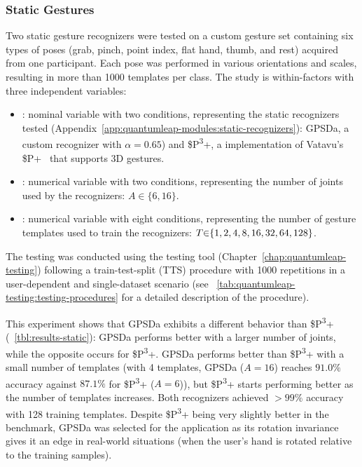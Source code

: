 \subsubsection{Static Gestures}
Two static gesture recognizers were tested on a custom gesture set containing six types of poses (grab, pinch, point index, flat hand, thumb, and rest) acquired from one participant. Each pose was performed in various orientations and scales, resulting in more than 1000 templates per class. The study is within-factors with three independent variables: 
\begin{itemize}
    \item {}: nominal variable with two conditions, representing the static recognizers tested (Appendix~\ref{app:quantumleap-modules:static-recognizers}): GPSDa, a custom recognizer with  $\alpha{=}0.65$) and \$P\textsuperscript{3}+, a implementation of Vatavu's \$P+~\cite{Vatavu:2017a} that supports 3D gestures.
    \item {}: numerical variable with two conditions, representing the number of joints used by the recognizers: $A{\in}\{6,16\}$.
    \item {}: numerical variable with eight conditions, representing the number of gesture templates used to train the recognizers: $\splitatcommas{T{\in}\{1,2,4,8,16,32,64,128\}}$.
\end{itemize}
The testing was conducted using the \ql testing tool (Chapter~\ref{chap:quantumleap-testing}) following a train-test-split (TTS) procedure with 1000 repetitions in a user-dependent and single-dataset scenario (see \tab~\ref{tab:quantumleap-testing:testing-procedures} for a detailed description of the procedure).


This experiment shows that GPSDa exhibits a different behavior than \$P\textsuperscript{3}+ (\tab~\ref{tbl:results-static}): GPSDa performs better with a larger number of joints, while the opposite occurs for \$P\textsuperscript{3}+. GPSDa performs better than \$P\textsuperscript{3}+ with a small number of templates (\eg with 4 templates, GPSDa ($A{=}16$) reaches $91.0\%$ accuracy against $87.1\%$ for \$P\textsuperscript{3}+ ($A{=}6$)), but \$P\textsuperscript{3}+ starts performing better as the number of templates increases. Both recognizers achieved ${>}99\%$ accuracy with 128 training templates. Despite \$P\textsuperscript{3}+ being very slightly better in the benchmark, GPSDa was selected for the \lui application as its rotation invariance gives it an edge in real-world situations (\eg when the user's hand is rotated relative to the training samples).

